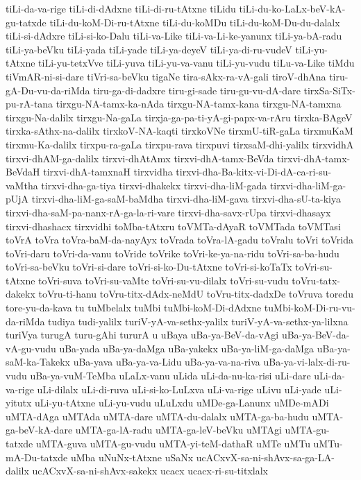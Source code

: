 {tiLi-da-va-rige
tiLi-di-dAdxne
tiLi-di-ru-tAtxne
tiLidu
tiLi-du-ko-LaLx-beV-kA-gu-tatxde
tiLi-du-koM-Di-ru-tAtxne
tiLi-du-koMDu
tiLi-du-koM-Du-du-dalalx
tiLi-si-dAdxre
tiLi-si-ko-Dalu
tiLi-va-Like
tiLi-va-Li-ke-yanunx
tiLi-ya-bA-radu
tiLi-ya-beVku
tiLi-yada
tiLi-yade
tiLi-ya-deyeV
tiLi-ya-di-ru-vudeV
tiLi-yu-tAtxne
tiLi-yu-tetxVve
tiLi-yuva
tiLi-yu-va-vanu
tiLi-yu-vudu
tiLu-va-Like
tiMdu
tiVmAR-ni-si-dare
tiVri-sa-beVku
tigaNe
tira-sAkx-ra-vA-gali
tiroV-dhAna
tiru-gA-Du-vu-da-riMda
tiru-ga-di-dadxre
tiru-gi-sade
tiru-gu-vu-dA-dare
tirxSa-SiTx-pu-rA-tana
tirxgu-NA-tamx-ka-nAda
tirxgu-NA-tamx-kana
tirxgu-NA-tamxna
tirxgu-Na-dalilx
tirxgu-Na-gaLa
tirxja-ga-pa-ti-yA-gi-papx-va-rAru
tirxka-BAgeV
tirxka-sAthx-na-dalilx
tirxkoV-NA-kaqti
tirxkoVNe
tirxmU-tiR-gaLa
tirxmuKaM
tirxmu-Ka-dalilx
tirxpu-ra-gaLa
tirxpu-rava
tirxpuvi
tirxsaM-dhi-yalilx
tirxvidhA
tirxvi-dhAM-ga-dalilx
tirxvi-dhAtAmx
tirxvi-dhA-tamx-BeVda
tirxvi-dhA-tamx-BeVdaH
tirxvi-dhA-tamxnaH
tirxvidha
tirxvi-dha-Ba-kitx-vi-Di-dA-ca-ri-su-vaMtha
tirxvi-dha-ga-tiya
tirxvi-dhakekx
tirxvi-dha-liM-gada
tirxvi-dha-liM-ga-pUjA
tirxvi-dha-liM-ga-saM-baMdha
tirxvi-dha-liM-gava
tirxvi-dha-sU-ta-kiya
tirxvi-dha-saM-pa-nanx-rA-ga-la-ri-vare
tirxvi-dha-savx-rUpa
tirxvi-dhasayx
tirxvi-dhashacx
tirxvidhi
toMba-tAtxru
toVMTa-dAyaR
toVMTada
toVMTasi
toVrA
toVra
toVra-baM-da-nayAyx
toVrada
toVra-lA-gadu
toVralu
toVri
toVrida
toVri-daru
toVri-da-vanu
toVride
toVrike
toVri-ke-ya-na-ridu
toVri-sa-ba-hudu
toVri-sa-beVku
toVri-si-dare
toVri-si-ko-Du-tAtxne
toVri-si-koTaTx
toVri-su-tAtxne
toVri-suva
toVri-su-vaMte
toVri-su-vu-dilalx
toVri-su-vudu
toVru-tatx-dakekx
toVru-ti-hanu
toVru-titx-dAdx-neMdU
toVru-titx-dadxDe
toVruva
toredu
tore-yu-da-kava
tu
tuMbelalx
tuMbi
tuMbi-koM-Di-dAdxne
tuMbi-koM-Di-ru-vu-da-riMda
tudiya
tudi-yalilx
turiV-yA-va-sethx-yalilx
turiV-yA-va-sethx-ya-lilxna
turiVya
turugA
turu-gAhi
tururA
u
uBaya
uBa-ya-BeV-da-vAgi
uBa-ya-BeV-da-vA-gu-vudu
uBa-yada
uBa-ya-daMga
uBa-yakekx
uBa-ya-liM-ga-daMga
uBa-ya-saM-ka-Takekx
uBa-yava
uBa-ya-va-Lidu
uBa-ya-va-na-riva
uBa-ya-vi-lalx-di-ru-vudu
uBa-ya-vuM-TeMba
uLaLx-vanu
uLida
uLi-da-nu-ka-risi
uLi-dare
uLi-da-va-rige
uLi-dilalx
uLi-di-ruva
uLi-si-ko-LuLxva
uLi-va-rige
uLivu
uLi-yade
uLi-yitutx
uLi-yu-tAtxne
uLi-yu-vudu
uLuLxdu
uMDe-ga-Lanunx
uMDe-mADi
uMTA-dAga
uMTAda
uMTA-dare
uMTA-du-dalalx
uMTA-ga-ba-hudu
uMTA-ga-beV-kA-dare
uMTA-ga-lA-radu
uMTA-ga-leV-beVku
uMTAgi
uMTA-gu-tatxde
uMTA-guva
uMTA-gu-vudu
uMTA-yi-teM-dathaR
uMTe
uMTu
uMTu-mA-Du-tatxde
uMba
uNuNx-tAtxne
uSaNx
ucACxvX-sa-ni-shAvx-sa-ga-LA-dalilx
ucACxvX-sa-ni-shAvx-sakekx
ucacx
ucacx-ri-su-titxlalx
}
